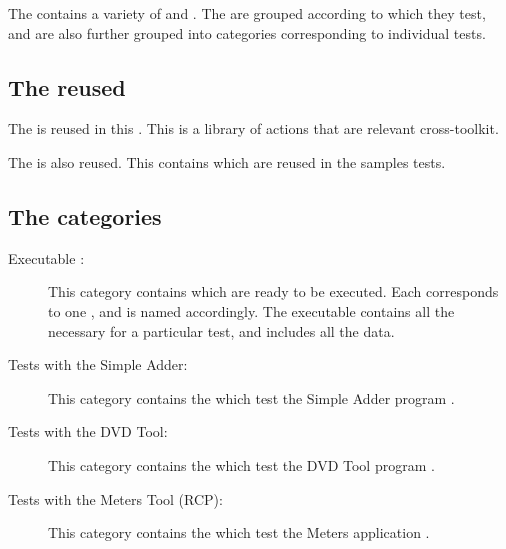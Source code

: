 The \gdproject{} contains a variety of \gdcases{} and \gdsuites{}. The \gdcases{} are grouped according to which \gdaut{} they test, and are also further grouped into categories corresponding to individual tests. 

\subsection{The reused \gdprojects{}}

The \gdproject{}  is reused in this \gdproject{}. This \gdproject{} is a library of actions that are relevant cross-toolkit. 

The \gdproject{}  is also reused. This contains \gdcases{} which are reused in the samples tests. 


\subsection{The categories}
\begin{description}
\item [Executable \gdcases:]{This category contains \gdcases{} which are ready to be executed. Each \gdcase{} corresponds to one \gdsuite{}, and is named accordingly. The executable \gdcase{} contains all the \gdcases{} necessary for a particular test, and includes all the data. }
\item [Tests with the Simple Adder:]{This category contains the \gdcases{} which test the Simple Adder program .}
\item [Tests with the DVD Tool:]{This category contains the \gdcases{} which test the DVD Tool program .}
\item[Tests with the Meters Tool (RCP):]{This category contains the \gdcases{} which test the Meters application . }
\end{description}


